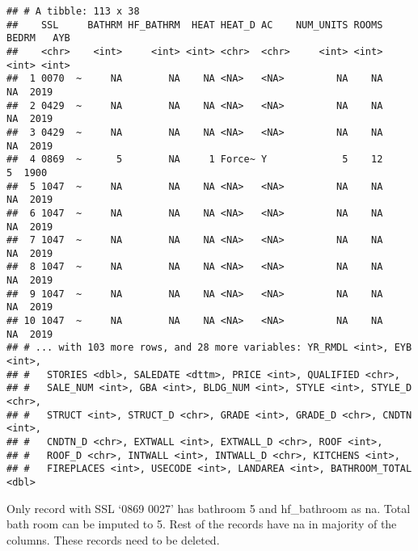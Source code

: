 \documentclass[]{article}
\newenvironment{Shaded}{\begin{snugshade}}{\end{snugshade}}
\newcommand{\DecValTok}[1]{\textcolor[rgb]{0.00,0.00,0.81}{#1}}
\newcommand{\KeywordTok}[1]{\textcolor[rgb]{0.13,0.29,0.53}{\textbf{#1}}}
\newcommand{\NormalTok}[1]{#1}
\newcommand{\OperatorTok}[1]{\textcolor[rgb]{0.81,0.36,0.00}{\textbf{#1}}}
\newcommand{\StringTok}[1]{\textcolor[rgb]{0.31,0.60,0.02}{#1}}
\begin{document}
\begin{verbatim}
## # A tibble: 113 x 38
##    SSL     BATHRM HF_BATHRM  HEAT HEAT_D AC    NUM_UNITS ROOMS BEDRM   AYB
##    <chr>    <int>     <int> <int> <chr>  <chr>     <int> <int> <int> <int>
##  1 0070  ~     NA        NA    NA <NA>   <NA>         NA    NA    NA  2019
##  2 0429  ~     NA        NA    NA <NA>   <NA>         NA    NA    NA  2019
##  3 0429  ~     NA        NA    NA <NA>   <NA>         NA    NA    NA  2019
##  4 0869  ~      5        NA     1 Force~ Y             5    12     5  1900
##  5 1047  ~     NA        NA    NA <NA>   <NA>         NA    NA    NA  2019
##  6 1047  ~     NA        NA    NA <NA>   <NA>         NA    NA    NA  2019
##  7 1047  ~     NA        NA    NA <NA>   <NA>         NA    NA    NA  2019
##  8 1047  ~     NA        NA    NA <NA>   <NA>         NA    NA    NA  2019
##  9 1047  ~     NA        NA    NA <NA>   <NA>         NA    NA    NA  2019
## 10 1047  ~     NA        NA    NA <NA>   <NA>         NA    NA    NA  2019
## # ... with 103 more rows, and 28 more variables: YR_RMDL <int>, EYB <int>,
## #   STORIES <dbl>, SALEDATE <dttm>, PRICE <int>, QUALIFIED <chr>,
## #   SALE_NUM <int>, GBA <int>, BLDG_NUM <int>, STYLE <int>, STYLE_D <chr>,
## #   STRUCT <int>, STRUCT_D <chr>, GRADE <int>, GRADE_D <chr>, CNDTN <int>,
## #   CNDTN_D <chr>, EXTWALL <int>, EXTWALL_D <chr>, ROOF <int>,
## #   ROOF_D <chr>, INTWALL <int>, INTWALL_D <chr>, KITCHENS <int>,
## #   FIREPLACES <int>, USECODE <int>, LANDAREA <int>, BATHROOM_TOTAL <dbl>
\end{verbatim}

Only record with SSL `0869 0027' has bathroom 5 and hf\_bathroom as na.
Total bath room can be imputed to 5. Rest of the records have na in
majority of the columns. These records need to be deleted.

\begin{Shaded}
\end{Shaded}
\end{document}
